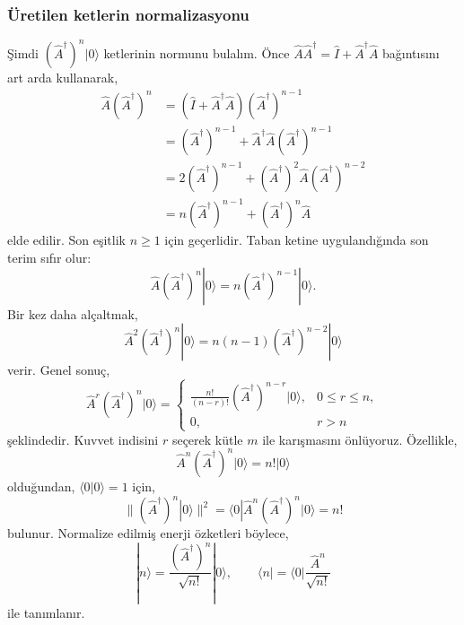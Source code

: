 \documentclass[00_kitap.tex]{subfiles}
\begin{document}
\subsubsection{Üretilen ketlerin normalizasyonu}

Şimdi $(\hat A^\dagger)^n|0\rangle$ ketlerinin normunu bulalım.
Önce $\hat A\hat A^\dagger=\hat I+\hat A^\dagger\hat A$
bağıntısını art arda kullanarak,
\begin{align}
 \hat A(\hat A^\dagger)^n
 &=(\hat I+\hat A^\dagger\hat A)(\hat A^\dagger)^{n-1}\\
 &=(\hat A^\dagger)^{n-1}
   +\hat A^\dagger\hat A(\hat A^\dagger)^{n-1}\\
 &=2(\hat A^\dagger)^{n-1}
   +(\hat A^\dagger)^2\hat A(\hat A^\dagger)^{n-2}\\
 &=n(\hat A^\dagger)^{n-1}+(\hat A^\dagger)^n\hat A
 \label{eq:06_normal_siralama}
\end{align}
elde edilir. Son eşitlik $n\ge1$ için geçerlidir. Taban ketine
uygulandığında son terim sıfır olur:
\begin{equation}
 \hat A(\hat A^\dagger)^n|0\rangle
 =n(\hat A^\dagger)^{n-1}|0\rangle.
\end{equation}
Bir kez daha alçaltmak,
\begin{equation}
 \hat A^2(\hat A^\dagger)^n|0\rangle
 =n(n-1)(\hat A^\dagger)^{n-2}|0\rangle
\end{equation}
verir. Genel sonuç,
\begin{equation}
 \hat A^r(\hat A^\dagger)^n|0\rangle
 =\begin{cases}
 \displaystyle\frac{n!}{(n-r)!}
       (\hat A^\dagger)^{n-r}|0\rangle,&0\le r\le n,\\[5pt]
 0,&r>n
 \end{cases}
 \label{eq:06_tekrarli_alcaltma}
\end{equation}
şeklindedir. Kuvvet indisini $r$ seçerek kütle $m$ ile karışmasını
önlüyoruz. Özellikle,
\begin{equation}
 \hat A^n(\hat A^\dagger)^n|0\rangle=n!|0\rangle
\end{equation}
olduğundan, $\langle0|0\rangle=1$ için,
\begin{equation}
 \|(\hat A^\dagger)^n|0\rangle\|^2
 =\langle0|\hat A^n(\hat A^\dagger)^n|0\rangle=n!
\end{equation}
bulunur. Normalize edilmiş enerji özketleri böylece,
\begin{equation}
 \boxed{|n\rangle=\frac{(\hat A^\dagger)^n}{\sqrt{n!}}|0\rangle,
 \qquad\langle n|=\langle0|\frac{\hat A^n}{\sqrt{n!}}}
 \label{eq:06_fock_ket}
\end{equation}
ile tanımlanır.
\end{document}
